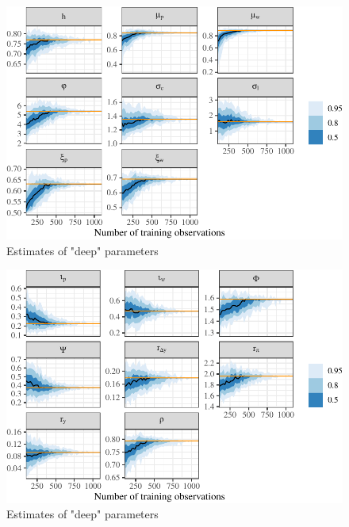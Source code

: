\documentclass[11pt]{article}
\begin{document}
\begin{figure}[t]

{\centering \includegraphics{gfx/deep1-1} 

}

\caption{Estimates of "deep" parameters}\label{fig:deep1}
\end{figure}

\begin{figure}[t]

{\centering \includegraphics{gfx/deep2-1} 

}

\caption{Estimates of "deep" parameters}\label{fig:deep2}
\end{figure}
\end{document}
